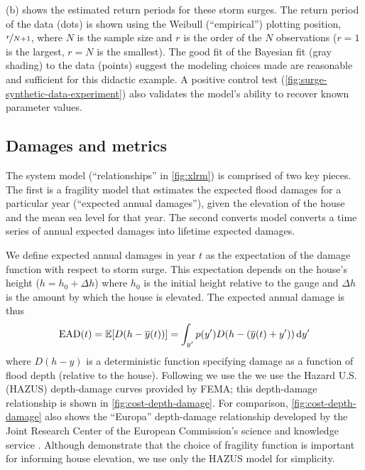 \documentclass[11pt]{article}
\begin{document}
(b) shows the estimated return periods for these storm surges.
The return period of the data (dots) is shown using the Weibull (``empirical'') plotting position, $\nicefrac{r}{N + 1}$, where $N$ is the sample size and $r$ is the order of the $N$ observations ($r=1$ is the largest, $r=N$ is the smallest).
The good fit of the Bayesian fit (gray shading) to the data (points) suggest the modeling choices made are reasonable and sufficient for this didactic example.
A positive control test (\cref{fig:surge-synthetic-data-experiment}) also validates the model's ability to recover known parameter values.

\subsection{Damages and metrics}\label{sec:case-metrics}

The system model (``relationships'' in \cref{fig:xlrm}) is comprised of two key pieces.
The first is a fragility model that estimates the expected flood damages for a particular year (``expected annual damages''), given the elevation of the house and the mean sea level for that year.
The second converts model converts a time series of annual expected damages into lifetime expected damages.

We define expected annual damages in year $t$ as the expectation of the damage function with respect to storm surge.
This expectation depends on the house's height ($h = h_0 + \Delta h$) where $h_0$ is the initial height relative to the gauge and $\Delta h$ is the amount by which the house is elevated.
The expected annual damage is thus
\begin{equation}\label{eq:ead}
    \textrm{EAD}(t) = \mathbb{E}[D \qty(h-\overline{y}(t))] = \int_{y'} p(y') D \qty(h - \qty(\overline{y}(t) + y')) \dd{y'}
\end{equation}
where $D(h-y)$ is a deterministic function specifying damage as a function of flood depth (relative to the house).
Following \citet{zarekarizi_suboptimal:2020} we use the we use the Hazard U.S. (HAZUS) depth-damage curves provided by FEMA; this depth-damage relationship is shown in \cref{fig:cost-depth-damage}.
For comparison, \cref{fig:cost-depth-damage} also shows the ``Europa'' depth-damage relationship developed by the Joint Research Center of the European Commission's science and knowledge service \citep{huizinga_depthdamage:2016}.
Although \citet{zarekarizi_suboptimal:2020} demonstrate that the choice of fragility function is important for informing house elevation, we use only the HAZUS model for simplicity.
\end{document}
